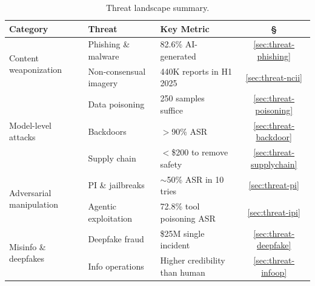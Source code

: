 
\begin{table}[htbp]
\centering
\caption{Threat landscape summary.}
\label{tab:threat-summary}
\fontsize{7}{9}\selectfont
\setlength{\tabcolsep}{6pt}
\renewcommand{\arraystretch}{1.3}
\begin{tabular}{l  l l c}          %
\toprule
\textbf{Category} & \textbf{Threat} & \textbf{Key Metric} & \textbf{\S} \\
\midrule
\multirow{2}{*}{Content weaponization}
  & \cellcolor{rowgray}Phishing \& malware
  & \cellcolor{rowgray}82.6\% AI-generated~\cite{knowbe4_2025}
  & \cellcolor{rowgray}\ref{sec:threat-phishing} \\
  & Non-consensual imagery
  & 440K reports in H1 2025~\cite{ncmec2025}
  & \ref{sec:threat-ncii} \\
\midrule                              %
\multirow{3}{*}{Model-level attacks}
  & \cellcolor{rowgray}Data poisoning
  & \cellcolor{rowgray}250 samples suffice~\cite{souly2025poisoning}
  & \cellcolor{rowgray}\ref{sec:threat-poisoning} \\
  & Backdoors
  & $>$90\% ASR~\cite{xu2024instructions}
  & \ref{sec:threat-backdoor} \\
  & \cellcolor{rowgray}Supply chain
  & \cellcolor{rowgray}$<$\$200 to remove safety~\cite{gade2023badllama}
  & \cellcolor{rowgray}\ref{sec:threat-supplychain} \\
\midrule                              %
\multirow{2}{*}{Adversarial manipulation}
  & PI \& jailbreaks
  & $\sim$50\% ASR in 10 tries~\cite{aisafetyreport2025}
  & \ref{sec:threat-pi} \\
  & \cellcolor{rowgray}Agentic exploitation
  & \cellcolor{rowgray}72.8\% tool poisoning ASR~\cite{wang2025mcptox}
  & \cellcolor{rowgray}\ref{sec:threat-ipi} \\
\midrule                              %
\multirow{2}{*}{Misinfo \& deepfakes}
  & Deepfake fraud
  & \$25M single incident~\cite{wef2025arup}
  & \ref{sec:threat-deepfake} \\
  & \cellcolor{rowgray}Info operations
  & \cellcolor{rowgray}Higher credibility than human~\cite{spitale2023gpt3}
  & \cellcolor{rowgray}\ref{sec:threat-infoop} \\
\bottomrule
\end{tabular}
\end{table}